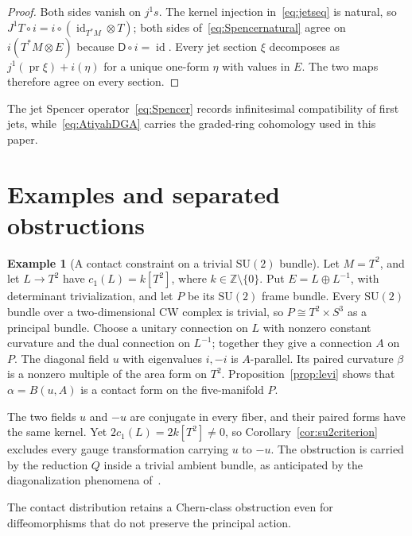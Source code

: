 \documentclass[11pt]{amsart}
\newcommand{\Z}{\mathbb Z}
\newcommand{\id}{\operatorname{id}}
\theoremstyle{plain}
\theoremstyle{definition}
\newtheorem{example}[theorem]{Example}
\theoremstyle{remark}
\begin{document}
\begin{proof}
Both sides vanish on $j^1s$.  The kernel injection in~\eqref{eq:jetseq} is natural, so $J^1T\circ i=i\circ(\id_{T^*M}\otimes T)$; both sides of~\eqref{eq:Spencernatural} agree on $i(T^*M\otimes E)$ because $\mathsf D\circ i=\id$.  Every jet section $\xi$ decomposes as $j^1(\operatorname{pr}\xi)+i(\eta)$ for a unique one-form $\eta$ with values in $E$.  The two maps therefore agree on every section.
\end{proof}

The jet Spencer operator~\eqref{eq:Spencer} records infinitesimal compatibility of first jets, while~\eqref{eq:AtiyahDGA} carries the graded-ring cohomology used in this paper.

\section{Examples and separated obstructions}\label{sec:examples}

\begin{example}[A contact constraint on a trivial $\mathrm{SU}(2)$ bundle]\label{ex:T2}
Let $M=T^2$, and let $L\to T^2$ have $c_1(L)=k[T^2]$, where $k\in\Z\setminus\{0\}$.  Put $E=L\oplus L^{-1}$, with determinant trivialization, and let $P$ be its $\mathrm{SU}(2)$ frame bundle.  Every $\mathrm{SU}(2)$ bundle over a two-dimensional CW complex is trivial, so $P\cong T^2\times S^3$ as a principal bundle.  Choose a unitary connection on $L$ with nonzero constant curvature and the dual connection on $L^{-1}$; together they give a connection $A$ on $P$.  The diagonal field $u$ with eigenvalues $i,-i$ is $A$-parallel.  Its paired curvature $\beta$ is a nonzero multiple of the area form on $T^2$.  Proposition~\ref{prop:levi} shows that $\alpha=B(u,A)$ is a contact form on the five-manifold $P$.

The two fields $u$ and $-u$ are conjugate in every fiber, and their paired forms have the same kernel.  Yet $2c_1(L)=2k[T^2]\ne0$, so Corollary~\ref{cor:su2criterion} excludes every gauge transformation carrying $u$ to $-u$.  The obstruction is carried by the reduction $Q$ inside a trivial ambient bundle, as anticipated by the diagonalization phenomena of~\cite{BlauThompson}.
\end{example}

The contact distribution retains a Chern-class obstruction even for diffeomorphisms that do not preserve the principal action.
\end{document}
